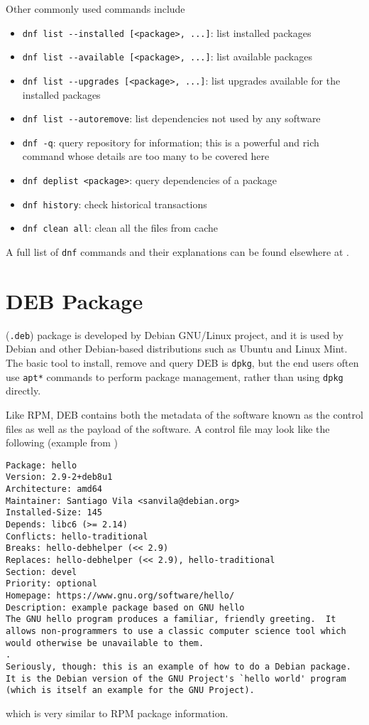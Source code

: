 Other commonly used commands include
\begin{itemize}
	\item \verb|dnf list --installed [<package>, ...]|: list installed packages
	\item \verb|dnf list --available [<package>, ...]|: list available packages
	\item \verb|dnf list --upgrades [<package>, ...]|: list upgrades available for the installed packages
	\item \verb|dnf list --autoremove|: list dependencies not used by any software
	\item \verb|dnf -q|: query repository for information; this is a powerful and rich command whose details are too many to be covered here
	\item \verb|dnf deplist <package>|: query dependencies of a package
	\item \verb|dnf history|: check historical transactions
	\item \verb|dnf clean all|: clean all the files from cache
\end{itemize}

A full list of \verb|dnf| commands and their explanations can be found elsewhere at \cite{redhat2024dnf}.

\section{DEB Package}

 (\verb|.deb|) package is developed by Debian GNU/Linux project, and it is used by Debian and other Debian-based distributions such as Ubuntu and Linux Mint. The basic tool to install, remove and query DEB is \verb|dpkg|, but the end users often use \verb|apt*| commands to perform package management, rather than using \verb|dpkg| directly.

Like RPM, DEB contains both the metadata of the software known as the control files as well as the payload of the software. A control file may look like the following (example from \cite{debian2024debianpackagemanagement})
\begin{lstlisting}
Package: hello
Version: 2.9-2+deb8u1
Architecture: amd64
Maintainer: Santiago Vila <sanvila@debian.org>
Installed-Size: 145
Depends: libc6 (>= 2.14)
Conflicts: hello-traditional
Breaks: hello-debhelper (<< 2.9)
Replaces: hello-debhelper (<< 2.9), hello-traditional
Section: devel
Priority: optional
Homepage: https://www.gnu.org/software/hello/
Description: example package based on GNU hello
The GNU hello program produces a familiar, friendly greeting.  It
allows non-programmers to use a classic computer science tool which
would otherwise be unavailable to them.
.
Seriously, though: this is an example of how to do a Debian package.
It is the Debian version of the GNU Project's `hello world' program
(which is itself an example for the GNU Project).
\end{lstlisting}
which is very similar to RPM package information.

